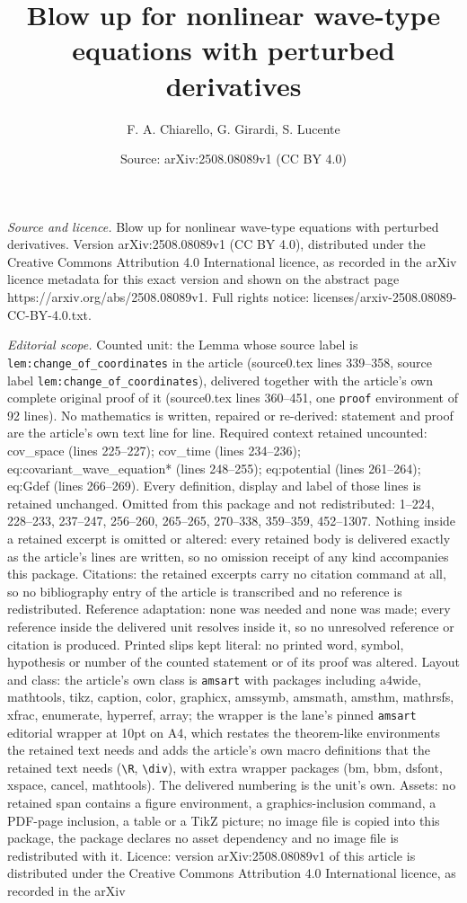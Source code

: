 \documentclass[10pt,a4paper]{amsart}
\title[Blow up for nonlinear wave-type equations with perturbed der]{Blow up for nonlinear wave-type equations with perturbed derivatives}
\author{F. A. Chiarello, G. Girardi, S. Lucente}
\date{Source: arXiv:2508.08089v1 (CC BY 4.0)}
\begin{document}
\maketitle

\noindent\emph{Source and licence.} Blow up for nonlinear wave-type equations with perturbed derivatives. Version arXiv:2508.08089v1 (CC BY 4.0), distributed under the Creative Commons Attribution 4.0 International licence, as recorded in the arXiv licence metadata for this exact version and shown on the abstract page https://arxiv.org/abs/2508.08089v1. Full rights notice: licenses/arxiv-2508.08089-CC-BY-4.0.txt.\par\smallskip

\noindent\textit{Editorial scope.} Counted unit: the Lemma whose source label is \texttt{lem:change\_of\_coordinates} in the article (source0.tex lines 339--358, source label \texttt{lem:change\_of\_coordinates}), delivered together with the article's own complete original proof of it (source0.tex lines 360--451, one \texttt{proof} environment of 92 lines). No mathematics is written, repaired or re-derived: statement and proof are the article's own text line for line. Required context retained uncounted: cov\_space (lines 225--227); cov\_time (lines 234--236); eq:covariant\_wave\_equation* (lines 248--255); eq:potential (lines 261--264); eq:Gdef (lines 266--269). Every definition, display and label of those lines is retained unchanged. Omitted from this package and not redistributed: 1--224, 228--233, 237--247, 256--260, 265--265, 270--338, 359--359, 452--1307. Nothing inside a retained excerpt is omitted or altered: every retained body is delivered exactly as the article's lines are written, so no omission receipt of any kind accompanies this package. Citations: the retained excerpts carry no citation command at all, so no bibliography entry of the article is transcribed and no reference is redistributed. Reference adaptation: none was needed and none was made; every reference inside the delivered unit resolves inside it, so no unresolved reference or citation is produced. Printed slips kept literal: no printed word, symbol, hypothesis or number of the counted statement or of its proof was altered. Layout and class: the article's own class is \texttt{amsart} with packages including a4wide, mathtools, tikz, caption, color, graphicx, amssymb, amsmath, amsthm, mathrsfs, xfrac, enumerate, hyperref, array; the wrapper is the lane's pinned \texttt{amsart} editorial wrapper at 10pt on A4, which restates the theorem-like environments the retained text needs and adds the article's own macro definitions that the retained text needs (\texttt{\textbackslash R}, \texttt{\textbackslash div}), with extra wrapper packages (bm, bbm, dsfont, xspace, cancel, mathtools). The delivered numbering is the unit's own. Assets: no retained span contains a figure environment, a graphics-inclusion command, a PDF-page inclusion, a table or a TikZ picture; no image file is copied into this package, the package declares no asset dependency and no image file is redistributed with it. Licence: version arXiv:2508.08089v1 of this article is distributed under the Creative Commons Attribution 4.0 International licence, as recorded in the arXiv 
\end{document}
